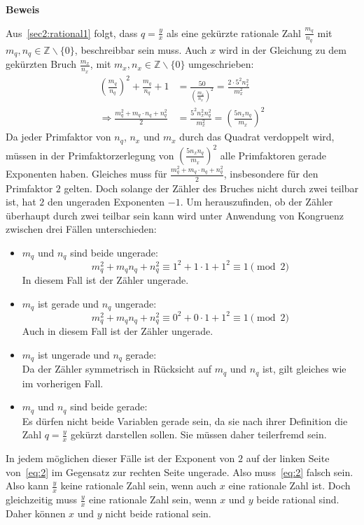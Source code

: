 \documentclass[10pt, a4paper, reqno]{amsart}
\makeatletter
\renewcommand\proofname{Beweis}
\renewenvironment{proof}[1][\proofname]{\par
\pushQED{\qed}%
\normalfont \topsep6\p@\@plus6\p@\relax
\trivlist
\item\relax
{\bfseries#1}\hspace\labelsep\ignorespaces
}{%
\popQED\endtrivlist\@endpefalse
}
\makeatother
\begin{document}
\begin{proof}
  Aus~\autoref{sec2:rational1} folgt, dass $q=\frac{y}{x}$ als eine gekürzte
  rationale Zahl $\frac{m_q}{n_q}$ mit $m_q,n_q\in\mathbb{Z}\backslash\{0\}$,
  beschreibbar sein muss. Auch $x$ wird in der Gleichung zu dem gekürzten Bruch $\frac{m_x}{n_x}$, mit
  $m_x,n_x\in\mathbb{Z}\backslash\{0\}$ umgeschrieben:
  \begin{equation}
    \label{eq:2}
    \begin{split}
      \left(\frac{m_q}{n_q}\right)^2+\frac{m_q}{n_q}+1&=\frac{50}{\left(\frac{m_x}{n_x}\right)^2}=\frac{2\cdot 5^2n_x^2}{m_x^2}\\
      \Rightarrow \frac{m_q^2+m_q\cdot n_q +
        n_q^2}{2}&=\frac{5^2n_x^2n_q^2}{m_x^2} =\left(\frac{5n_xn_q}{m_x}\right)^2
    \end{split}
  \end{equation}
  Da jeder Primfaktor von $n_q$, $n_x$ und $m_x$ durch das Quadrat verdoppelt
  wird, müssen in der Primfaktorzerlegung von
  $\left(\frac{5n_xn_q}{m_x}\right)^2$ alle Primfaktoren gerade Exponenten
  haben. Gleiches muss für $\frac{m_q^2+m_q\cdot{}n_q+n_q^2}{2}$, insbesondere
  für den Primfaktor $2$ gelten. Doch solange der Zähler des Bruches nicht durch
  zwei teilbar ist, hat $2$ den ungeraden Exponenten $-1$. Um
  herauszufinden, ob der Zähler überhaupt durch zwei teilbar sein kann wird
  unter Anwendung von Kongruenz zwischen drei Fällen unterschieden:
  \begin{itemize}[itemsep=2ex]
  \item $m_q$ und $n_q$ sind beide ungerade:
    \[m_q^2+m_qn_q+n_q^2\equiv1^2+1\cdot1+1^2\equiv1\pmod{2}\] In
    diesem Fall ist der Zähler ungerade.
  \item $m_q$ ist gerade und $n_q$ ungerade:
    \[m_q^2+m_qn_q+n_q^2\equiv0^2+0\cdot1+1^2\equiv1\pmod{2}\] Auch in diesem Fall ist der Zähler ungerade.
  \item $m_q$ ist ungerade und $n_q$ gerade:\\
    Da der Zähler symmetrisch in Rücksicht auf $m_q$ und $n_q$ ist, gilt gleiches wie im vorherigen
    Fall.
  \item $m_q$ und $n_q$ sind beide gerade:\\
    Es dürfen nicht beide Variablen gerade sein, da sie nach ihrer Definition die
    Zahl $q=\frac{y}{x}$ gekürzt darstellen sollen. Sie müssen daher teilerfremd sein.
  \end{itemize}
  In jedem möglichen dieser Fälle ist der Exponent von $2$ auf der linken Seite
  von~\eqref{eq:2} im Gegensatz zur rechten Seite ungerade. Also
  muss~\eqref{eq:2} falsch sein. Also kann $\frac{y}{x}$ keine rationale
  Zahl sein, wenn auch $x$ eine rationale
  Zahl ist. Doch gleichzeitig muss $\frac{y}{x}$ eine rationale Zahl sein, wenn $x$ und $y$ beide rational
  sind.
  Daher können $x$ und $y$ nicht beide rational sein.
\end{proof}
\end{document}
